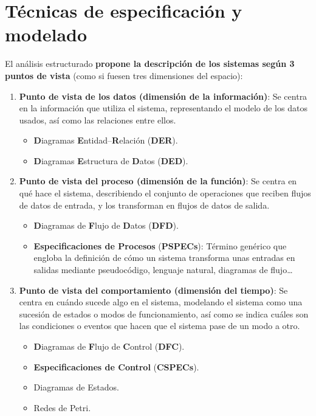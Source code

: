 \section{Técnicas de especificación y modelado}

El análisis estructurado \textbf{propone la descripción de los sistemas según 3 puntos de vista} (como si fuesen tres dimensiones del espacio):

\begin{enumerate}
    \item \textbf{Punto de vista de los datos (dimensión de la información)}: Se centra en la información que utiliza el sistema, representando el modelo de los datos usados, así como las relaciones entre ellos.
          \begin{itemize}
              \item \textbf{D}iagramas \textbf{E}ntidad--\textbf{R}elación (\textbf{DER}).
              \item \textbf{D}iagramas \textbf{E}structura de \textbf{D}atos (\textbf{DED}).
          \end{itemize}
    \item \textbf{Punto de vista del proceso (dimensión de la función)}: Se centra en qué hace el sistema, describiendo el conjunto de operaciones que reciben flujos de datos de entrada, y los transforman en flujos de datos de salida.
          \begin{itemize}
              \item \textbf{D}iagramas de \textbf{F}lujo de \textbf{D}atos (\textbf{DFD}).
              \item \textbf{Especificaciones de Procesos} (\textbf{PSPECs}): Término genérico que engloba la definición de cómo un sistema transforma unas entradas en salidas mediante pseudocódigo, lenguaje natural, diagramas de flujo\ldots
          \end{itemize}
    \item \textbf{Punto de vista del comportamiento (dimensión del tiempo)}: Se centra en cuándo sucede algo en el sistema, modelando el sistema como una sucesión de estados o modos de funcionamiento, así como se indica cuáles son las condiciones o eventos que hacen que el sistema pase de un modo a otro.
          \begin{itemize}
              \item \textbf{D}iagramas de \textbf{F}lujo de \textbf{C}ontrol (\textbf{DFC}).
              \item \textbf{Especificaciones de Control} (\textbf{CSPECs}).
              \item Diagramas de Estados.
              \item Redes de Petri.
          \end{itemize}
\end{enumerate}

